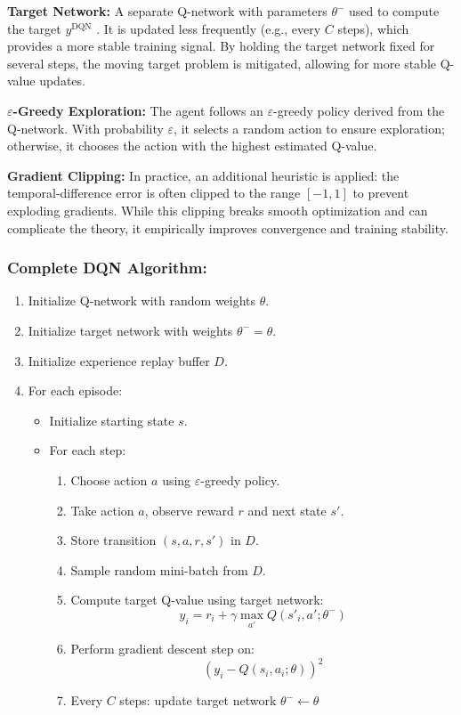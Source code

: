 \documentclass[../Main.tex]{subfiles}
\begin{document}
\textbf{Target Network:} A separate Q-network with parameters $\theta^-$ used to compute the target $y^{\text{DQN}}$ \cite{mnih2015human}. It is updated less frequently (e.g., every $C$ steps), which provides a more stable training signal. By holding the target network fixed for several steps, the moving target problem is mitigated, allowing for more stable Q-value updates.

\textbf{$\varepsilon$-Greedy Exploration:} The agent follows an $\varepsilon$-greedy policy derived from the Q-network. With probability $\varepsilon$, it selects a random action to ensure exploration; otherwise, it chooses the action with the highest estimated Q-value.

\textbf{Gradient Clipping:} In practice, an additional heuristic is applied: the temporal-difference error is often clipped to the range $[-1, 1]$ to prevent exploding gradients. While this clipping breaks smooth optimization and can complicate the theory, it empirically improves convergence and training stability.

\subsubsection{Complete DQN Algorithm:}

\begin{enumerate}
    \item Initialize Q-network with random weights $\theta$.
    \item Initialize target network with weights $\theta^- = \theta$.
    \item Initialize experience replay buffer $D$.
    \item For each episode:
    \begin{itemize}
        \item Initialize starting state $s$.
        \item For each step:
        \begin{enumerate}
            \item Choose action $a$ using $\varepsilon$-greedy policy.
            \item Take action $a$, observe reward $r$ and next state $s'$.
            \item Store transition $(s, a, r, s')$ in $D$.
            \item Sample random mini-batch from $D$.
            \item Compute target Q-value using target network:
            \[
            y_i = r_i + \gamma \max_{a'} Q(s'_i, a'; \theta^-)
            \]
            \item Perform gradient descent step on:
            \[
            \left( y_i - Q(s_i, a_i; \theta) \right)^2
            \]
            \item Every $C$ steps: update target network $\theta^- \leftarrow \theta$
        \end{enumerate}
    \end{itemize}
\end{enumerate}
\end{document}
